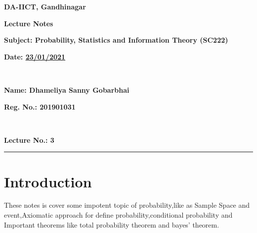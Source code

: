 \documentclass[a4paper,12pt]{article}
\theoremstyle{definition}
\begin{document}
\begin{minipage}[t]{\textwidth}%
  \centering
{\textbf{DA-IICT, Gandhinagar}}\par
  {\textbf{Lecture Notes}} \par
{\textbf{Subject: Probability, Statistics and Information Theory (SC222)}}
\end{minipage}
\par
\bigskip
\begin{minipage}[t]{.7\textwidth}%
  \textbf{Date: \underline{23/01/2021}} \par
  \textbf{~} \par
  \textbf{Name: Dhameliya Sanny Gobarbhai} \par
\end{minipage}%
\hfill
\begin{minipage}[t]{.4\textwidth}%
  \textbf{Reg. No.: 201901031} \par
  \textbf{~} \par
  \textbf{Lecture No.: 3} \par

\end{minipage}
\vskip 0.5cm
\hrule
\thispagestyle{empty}
\vskip 1.0cm
\section*{Introduction}
\par  These notes is cover some impotent topic of probability,like as Sample Space and event,Axiomatic approach for define probability,conditional probability and Important theorems like total probability theorem and bayes' theorem.
\end{document}
